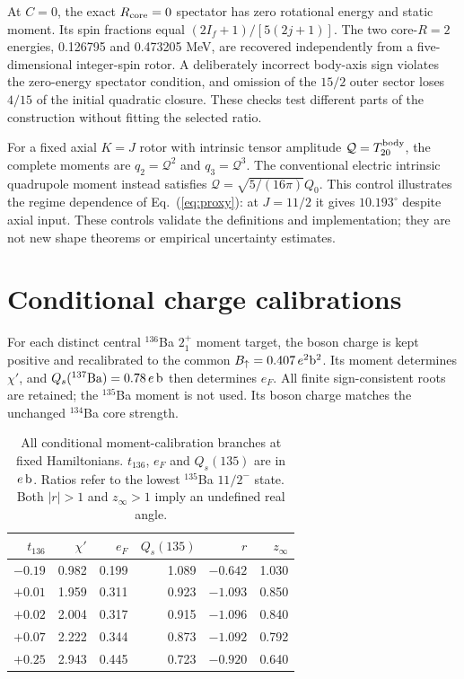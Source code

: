 At $C=0$, the exact $R_{\rm core}=0$ spectator has zero rotational
energy and static moment. Its spin fractions equal
$(2I_f+1)/[5(2j+1)]$. The two core-$R=2$ energies, 0.126795 and
0.473205 MeV, are recovered independently from a five-dimensional
integer-spin rotor. A deliberately incorrect body-axis sign violates
the zero-energy spectator condition, and omission of the $15/2$
outer sector loses $4/15$ of the initial quadratic closure.
These checks test different parts of the construction without fitting
the selected ratio.

For a fixed axial $K=J$ rotor with intrinsic tensor amplitude
$\mathcal Q=T_{20}^{\rm body}$, the complete moments are
$q_2=\mathcal Q^2$ and $q_3=\mathcal Q^3$.
The conventional electric intrinsic quadrupole moment instead satisfies
$\mathcal Q=\sqrt{5/(16\pi)}Q_0$.
This control illustrates the regime dependence of Eq.~(\ref{eq:proxy}):
at $J=11/2$ it gives $10.193^\circ$ despite axial input.
These controls validate the definitions and implementation; they are not new
shape theorems or empirical uncertainty estimates.

\section{Conditional charge calibrations}\label{app:calibrated}

For each distinct central $^{136}$Ba $2_1^+$ moment target, the
boson charge is kept positive and recalibrated to the common
$B_\uparrow=0.407\,e^2{\rm b}^2$. Its moment determines $\chi'$,
and $Q_s(^{137}{\rm Ba})=0.78\,e\,{\rm b}$ then determines $e_F$.
All finite sign-consistent roots are retained; the $^{135}$Ba
moment is not used. Its boson charge matches the unchanged
$^{134}$Ba core strength.

\begin{table}[t]
\caption{All conditional moment-calibration branches at fixed
Hamiltonians. $t_{136}$, $e_F$ and $Q_s(135)$ are in $e\,{\rm b}$.
Ratios refer to the lowest $^{135}$Ba $11/2^-$ state.
Both $|r|>1$ and $z_\infty>1$ imply an undefined real angle.}
\label{tab:calibrated}
\centering
\setlength{\tabcolsep}{3pt}
\begin{tabular}{rrrrrr}
\toprule
$t_{136}$ & $\chi'$ & $e_F$ & $Q_s(135)$ & $r$ & $z_\infty$\\
\midrule
$-0.19$ & 0.982 & 0.199 & 1.089 & $-0.642$ & 1.030\\
$+0.01$ & 1.959 & 0.311 & 0.923 & $-1.093$ & 0.850\\
$+0.02$ & 2.004 & 0.317 & 0.915 & $-1.096$ & 0.840\\
$+0.07$ & 2.222 & 0.344 & 0.873 & $-1.092$ & 0.792\\
$+0.25$ & 2.943 & 0.445 & 0.723 & $-0.920$ & 0.640\\
\bottomrule
\end{tabular}
\end{table}


